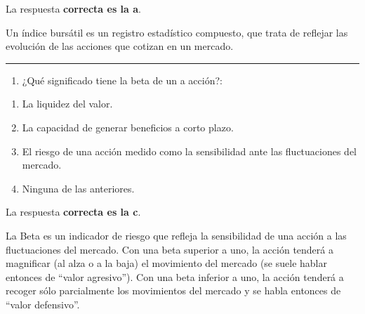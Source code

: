 \documentclass[
  letterpaper,
  DIV=11,
  numbers=noendperiod]{scrreprt}
\providecommand{\tightlist}{%
  \setlength{\itemsep}{0pt}\setlength{\parskip}{0pt}}\usepackage{longtable,booktabs,array}
\begin{document}
\begin{tcolorbox}[enhanced jigsaw, left=2mm, opacityback=0, colback=white, breakable, arc=.35mm, bottomrule=.15mm, rightrule=.15mm, toprule=.15mm, leftrule=.75mm, colframe=quarto-callout-tip-color-frame]
\begin{minipage}[t]{5.5mm}
\textcolor{quarto-callout-tip-color}{\faLightbulb}
\end{minipage}%
\begin{minipage}[t]{\textwidth - 5.5mm}

La respuesta \textbf{correcta es la a}.

Un índice bursátil es un registro estadístico compuesto, que trata de
reflejar las evolución de las acciones que cotizan en un mercado.

\end{minipage}%
\end{tcolorbox}

\begin{center}\rule{0.5\linewidth}{0.5pt}\end{center}

\begin{enumerate}
\def\labelenumi{\arabic{enumi}.}
\setcounter{enumi}{50}
\tightlist
\item
  ¿Qué significado tiene la beta de un a acción?:
\end{enumerate}

\begin{enumerate}
\def\labelenumi{\alph{enumi})}
\item
  La liquidez del valor.
\item
  La capacidad de generar beneficios a corto plazo.
\item
  El riesgo de una acción medido como la sensibilidad ante las
  fluctuaciones del mercado.
\item
  Ninguna de las anteriores.
\end{enumerate}

\begin{tcolorbox}[enhanced jigsaw, left=2mm, opacityback=0, colback=white, breakable, arc=.35mm, bottomrule=.15mm, rightrule=.15mm, toprule=.15mm, leftrule=.75mm, colframe=quarto-callout-tip-color-frame]
\begin{minipage}[t]{5.5mm}
\textcolor{quarto-callout-tip-color}{\faLightbulb}
\end{minipage}%
\begin{minipage}[t]{\textwidth - 5.5mm}

La respuesta \textbf{correcta es la c}.

La Beta es un indicador de riesgo que refleja la sensibilidad de una
acción a las fluctuaciones del mercado. Con una beta superior a uno, la
acción tenderá a magnificar (al alza o a la baja) el movimiento del
mercado (se suele hablar entonces de ``valor agresivo''). Con una beta
inferior a uno, la acción tenderá a recoger sólo parcialmente los
movimientos del mercado y se habla entonces de ``valor defensivo''.

\end{minipage}%
\end{tcolorbox}
\end{document}
